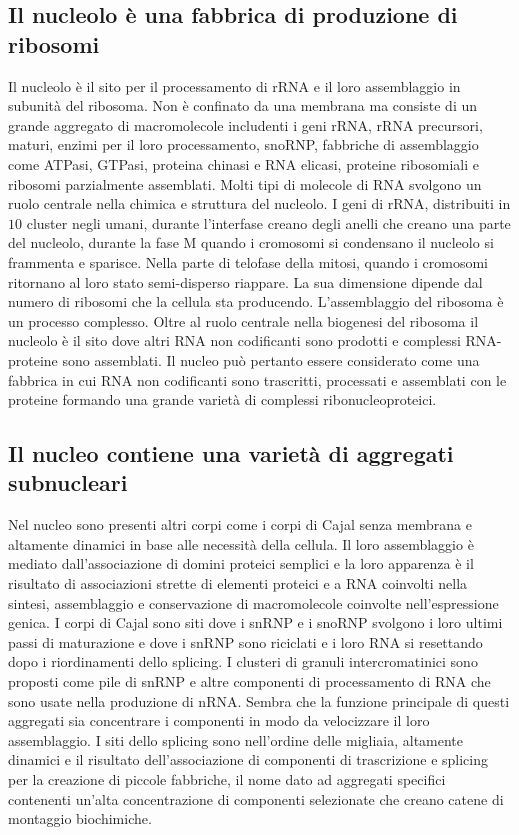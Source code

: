 \subsection{Il nucleolo \`e una fabbrica di produzione di ribosomi}
Il nucleolo \`e il sito per il processamento di rRNA e il loro assemblaggio in subunit\`a del ribosoma. Non \`e confinato da una membrana ma consiste di un grande aggregato di 
macromolecole includenti i geni rRNA, rRNA precursori, maturi, enzimi per il loro processamento, snoRNP, fabbriche di assemblaggio come ATPasi, GTPasi, proteina chinasi e RNA elicasi, 
proteine ribosomiali e ribosomi parzialmente assemblati. Molti tipi di molecole di RNA svolgono un ruolo centrale nella chimica e struttura del nucleolo. I geni di rRNA, distribuiti in
$10$ cluster negli umani, durante l'interfase creano degli anelli che creano una parte del nucleolo, durante la fase M quando i cromosomi si condensano il nucleolo si frammenta e 
sparisce. Nella parte di telofase della mitosi, quando i cromosomi ritornano al loro stato semi-disperso riappare. La sua dimensione dipende dal numero di ribosomi che la cellula sta
producendo. L'assemblaggio del ribosoma \`e un processo complesso. Oltre al ruolo centrale nella biogenesi del ribosoma il nucleolo \`e il sito dove altri RNA non codificanti sono
prodotti e complessi RNA-proteine sono assemblati. Il nucleo pu\`o pertanto essere considerato come una fabbrica in cui RNA non codificanti sono trascritti, processati e assemblati con
le proteine formando una grande variet\`a di complessi ribonucleoproteici. 
\subsection{Il nucleo contiene una variet\`a di aggregati subnucleari}
Nel nucleo sono presenti altri corpi come i corpi di Cajal senza membrana e altamente dinamici in base alle necessit\`a della cellula. Il loro assemblaggio \`e mediato dall'associazione
di domini proteici semplici e la loro apparenza \`e il risultato di associazioni strette di elementi proteici e a RNA coinvolti nella sintesi, assemblaggio e conservazione di 
macromolecole coinvolte nell'espressione genica. I corpi di Cajal sono siti dove i snRNP e i snoRNP svolgono i loro ultimi passi di maturazione e dove i snRNP sono riciclati e i loro RNA
si resettando dopo i riordinamenti dello splicing. I clusteri di granuli intercromatinici sono proposti come pile di snRNP e altre componenti di processamento di RNA che sono 
usate nella produzione di nRNA. Sembra che la funzione principale di questi aggregati sia concentrare i componenti in modo da velocizzare il loro assemblaggio. I siti dello splicing
sono nell'ordine delle migliaia, altamente dinamici e il risultato dell'associazione di componenti di trascrizione e splicing per la creazione di piccole fabbriche, il nome dato ad
aggregati specifici contenenti un'alta concentrazione di componenti selezionate che creano catene di montaggio biochimiche. 
